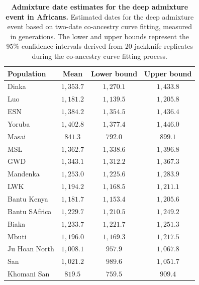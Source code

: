 \begin{table}[h!]
    \centering
\caption{\textbf{Admixture date estimates for the deep admixture event in Africans.} Estimated dates for the deep admixture event based on two-date co-ancestry curve fitting, measured in generations. The lower and upper bounds represent the 95\% confidence intervals derived from 20 jackknife replicates during the co-ancestry curve fitting process.}
\label{tab:gb_deep_admix_dates}
    \begin{tabular}{|l|c|c|c|} \hline 
         \textbf{Population}&  \textbf{Mean}&  \textbf{Lower bound}& \textbf{Upper bound}\\ \hline 
         Dinka&  $1{,}353.7$&  $1{,}270.1$& $1{,}433.8$\\ \hline 
         Luo&  $1{,}181.2$&  $1{,}139.5$& $1{,}205.8$\\ \hline 
         ESN&  $1{,}384.2$&  $1{,}354.5$& $1{,}436.4$\\ \hline 
         Yoruba&  $1{,}402.8$&  $1{,}377.4$& $1{,}446.0$\\ \hline 
         Masai&  $841.3$&  $792.0$& $899.1$\\ \hline 
         MSL&  $1{,}362.7$&  $1{,}338.6$& $1{,}396.8$\\ \hline 
         GWD&  $1{,}343.1$&  $1{,}312.2$& $1{,}367.3$\\ \hline 
         Mandenka&  $1{,}253.0$&  $1{,}225.6$& $1{,}283.9$\\ \hline 
         LWK&  $1{,}194.2$&  $1{,}168.5$& $1{,}211.1$\\ \hline
         Bantu Kenya& $1{,}181.7$& $1{,}153.4$& $1{,}205.6$\\\hline
         Bantu SAfrica& $1{,}229.7$& $1{,}210.5$& $1{,}249.2$\\\hline
         Biaka& $1{,}233.7$& $1{,}221.7$& $1{,}251.3$\\\hline
         Mbuti& $1{,}196.0$& $1{,}169.3$& $1{,}217.5$\\\hline
         Ju Hoan North& $1{,}008.1$& $957.9$& $1{,}067.8$\\\hline
         San& $1{,}021.2$& $989.6$& $1{,}051.7$\\\hline
         Khomani San& $819.5$& $759.5$& $909.4$\\\hline
    \end{tabular} 
\end{table}

